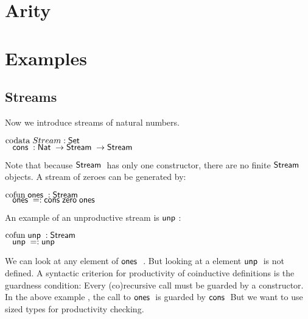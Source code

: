 \section{Arity}

\section{Examples}

\subsection{Streams}
Now we introduce streams of natural numbers.
\begin{bsp}
$\mathrm{codata}\; Stream : \mathsf{Set} $ \\
$\hspace*{3mm} \mathsf{cons}\; : \mathsf{Nat}\; \rightarrow \mathsf{Stream}\; \rightarrow \mathsf{Stream}\; $
\end{bsp}
Note that because $\mathsf{Stream}\;$ has only one constructor, there are no finite $\mathsf{Stream}\;$ objects.
A stream of zeroes can be generated by:
\begin{bsp}
$\mathrm{cofun}\; \mathsf{ones}\;: \mathsf{Stream}\; $ \\
$\hspace*{3mm} \mathsf{ones}\; = : \mathsf{cons}\; \mathsf{zero}\; \mathsf{ones}\;$
\end{bsp}

An example of an unproductive stream is $\mathsf{unp}\;$:
\begin{bsp}
$\mathrm{cofun}\; \mathsf{unp}\; : \mathsf{Stream}\; $ \\
$\hspace*{3mm} \mathsf{unp}\; = : \mathsf{unp}\;$
\end{bsp}
We can look at any element of $\mathsf{ones}\;$ .
But looking at a element $\mathsf{unp}\;$ is not defined. 
A syntactic criterion for productivity of coinductive definitions is the guardness condition:
Every (co)recursive call must be guarded by a constructor.
In the above example , the call to $\mathsf{ones}\;$ is guarded by $\mathsf{cons}\;$
But we want to use sized types for productivity checking.
